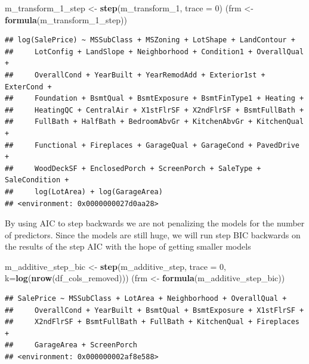 \documentclass[
]{article}
\newenvironment{Shaded}{\begin{snugshade}}{\end{snugshade}}
\newcommand{\DataTypeTok}[1]{\textcolor[rgb]{0.13,0.29,0.53}{#1}}
\newcommand{\DecValTok}[1]{\textcolor[rgb]{0.00,0.00,0.81}{#1}}
\newcommand{\KeywordTok}[1]{\textcolor[rgb]{0.13,0.29,0.53}{\textbf{#1}}}
\newcommand{\NormalTok}[1]{#1}
\newcommand{\StringTok}[1]{\textcolor[rgb]{0.31,0.60,0.02}{#1}}
\begin{document}
\begin{Shaded}
\begin{Highlighting}[]
\NormalTok{m_transform_}\DecValTok{1}\NormalTok{_step <-}\StringTok{ }\KeywordTok{step}\NormalTok{(m_transform_}\DecValTok{1}\NormalTok{, }\DataTypeTok{trace =} \DecValTok{0}\NormalTok{)}
\NormalTok{(frm <-}\StringTok{ }\KeywordTok{formula}\NormalTok{(m_transform_}\DecValTok{1}\NormalTok{_step))}
\end{Highlighting}
\end{Shaded}

\begin{verbatim}
## log(SalePrice) ~ MSSubClass + MSZoning + LotShape + LandContour + 
##     LotConfig + LandSlope + Neighborhood + Condition1 + OverallQual + 
##     OverallCond + YearBuilt + YearRemodAdd + Exterior1st + ExterCond + 
##     Foundation + BsmtQual + BsmtExposure + BsmtFinType1 + Heating + 
##     HeatingQC + CentralAir + X1stFlrSF + X2ndFlrSF + BsmtFullBath + 
##     FullBath + HalfBath + BedroomAbvGr + KitchenAbvGr + KitchenQual + 
##     Functional + Fireplaces + GarageQual + GarageCond + PavedDrive + 
##     WoodDeckSF + EnclosedPorch + ScreenPorch + SaleType + SaleCondition + 
##     log(LotArea) + log(GarageArea)
## <environment: 0x0000000027d0aa28>
\end{verbatim}

By using AIC to step backwards we are not penalizing the models for the number of predictors. Since the models are still huge, we will run step BIC backwards on the results of the step AIC with the hope of getting smaller models

\begin{Shaded}
\begin{Highlighting}[]
\NormalTok{m_additive_step_bic <-}\StringTok{ }\KeywordTok{step}\NormalTok{(m_additive_step, }\DataTypeTok{trace =} \DecValTok{0}\NormalTok{, }\DataTypeTok{k=}\KeywordTok{log}\NormalTok{(}\KeywordTok{nrow}\NormalTok{(df_cols_removed)))}
\NormalTok{(frm <-}\StringTok{ }\KeywordTok{formula}\NormalTok{(m_additive_step_bic))}
\end{Highlighting}
\end{Shaded}

\begin{verbatim}
## SalePrice ~ MSSubClass + LotArea + Neighborhood + OverallQual + 
##     OverallCond + YearBuilt + BsmtQual + BsmtExposure + X1stFlrSF + 
##     X2ndFlrSF + BsmtFullBath + FullBath + KitchenQual + Fireplaces + 
##     GarageArea + ScreenPorch
## <environment: 0x000000002af8e588>
\end{verbatim}
\end{document}
